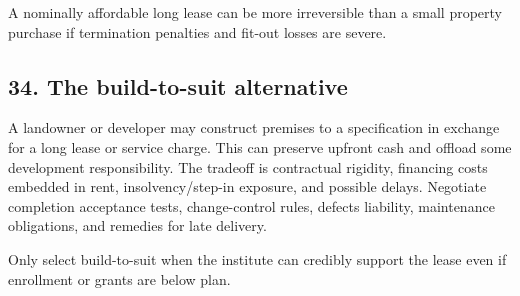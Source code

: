 A nominally affordable long lease can be more irreversible than a small property purchase if termination penalties and fit-out losses are severe.


\subsection{34. The build-to-suit alternative}

A landowner or developer may construct premises to a specification in exchange for a long lease or service charge. This can preserve upfront cash and offload some development responsibility. The tradeoff is contractual rigidity, financing costs embedded in rent, insolvency/step-in exposure, and possible delays. Negotiate completion acceptance tests, change-control rules, defects liability, maintenance obligations, and remedies for late delivery.

Only select build-to-suit when the institute can credibly support the lease even if enrollment or grants are below plan.
